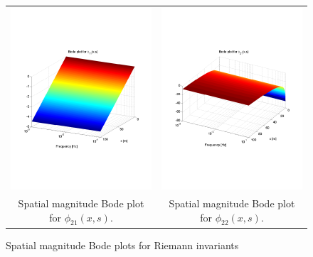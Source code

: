 \documentclass[preprint]{elsarticle}
\begin{document}
\begin{figure}
\begin{centering}
\begin{tabular}{cc}
\includegraphics[trim = 0mm 60mm 0mm 60mm, width = 8cm]{diagdistr11freeflow}
&
\includegraphics[trim = 0mm 60mm 0mm 60mm, width = 8cm]{diagdistr21freeflow}
\tabularnewline
Spatial magnitude Bode plot for $\phi_{21}(x,s)$.
&
Spatial magnitude Bode plot for $\phi_{22}(x,s)$.
\tabularnewline
\end{tabular}
\caption{Spatial magnitude Bode plots for Riemann invariants\label{Magn_spatial_diag}}
\par\end{centering}
\end{figure}
\end{document}
